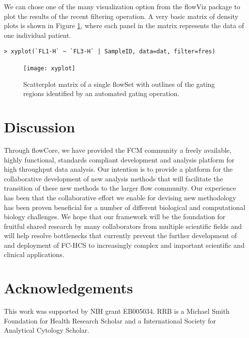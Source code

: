 \documentclass[12pt]{article}
\begin{document}
We can chose one of the many visualization option from the flowViz
package to plot the results of the recent filtering operation. A very
basic matrix of density plots is shown in Figure \ref{xyplot}, where
each panel in the matrix represents the data of one individual
patient.

\begin{verbatim}
> xyplot(`FL1-H` ~ `FL3-H` | SampleID, data=dat, filter=fres)
\end{verbatim}


\begin{figure}[htbp]
\centering
\texttt{[image: xyplot]}
\caption{\label{xyplot}%
Scatterplot matrix of a single flowSet with outlines of the gating
regions identified by an automated gating operation.}
\end{figure}



\section*{Discussion}

Through flowCore, we have provided the FCM community a freely
available, highly functional, standards compliant development and
analysis platform for high throughput data analysis.  Our intention is
to provide a platform for the collaborative development of new
analysis methods that will facilitate the transition of these new
methods to the larger flow community.  Our experience has been that the
collaborative effort we enable for devising new methodology has been
proven beneficial for a number of different biological and
computational biology challenges.  We hope that our framework will be
the foundation for fruitful shared research by many collaborators from
multiple scientific fields and will help resolve bottlenecks that
currently prevent the further development of and deployment of FC-HCS
to increasingly complex and important scientific and clinical
applications.

\section*{Acknowledgements}
This work was supported by NIH grant EB005034. RRB is a Michael Smith
Foundation for Health Research Scholar and a International Society for
Analytical Cytology Scholar.

  
 
\end{document}
